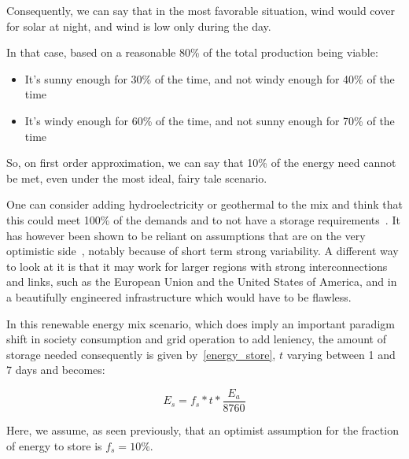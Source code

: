 Consequently, we can say that in the most favorable situation, wind would cover for solar at night, and wind is low only during the day.

\begin{remark}
In that case, based on a reasonable 80\% of the total production being viable:

\begin{itemize}
\item It's sunny enough for 30\% of the time, and not windy enough for 40\% of the time
\item It's windy enough for 60\% of the time, and not sunny enough for 70\% of the time
\end{itemize}

So, on first order approximation, we can say that 10\% of the energy need cannot be met, even under the most ideal, fairy tale scenario.

\end{remark}

One can consider adding hydroelectricity or geothermal to the mix and think that this could meet 100\% of the demands and to not have a storage requirements~. It has however been shown to be reliant on assumptions that are on the very optimistic side~, notably because of short term strong variability. A different way to look at it is that it may work for larger regions with strong interconnections and links, such as the European Union and the United States of America, and in a beautifully engineered infrastructure which would have to be flawless.



\begin{remark}

In this renewable energy mix scenario, which does imply an important paradigm shift in society consumption and grid operation to add leniency, the amount of storage needed consequently is given by~\ref{energy_store}, $t$ varying between 1 and 7 days and becomes:

\begin{equation}\label{energy_store}
E_s = f_s * t * \frac{E_a}{8760}
\end{equation}

Here, we assume, as seen previously, that an optimist assumption for the fraction of energy to store is $f_s = 10\%$.


\end{remark}


